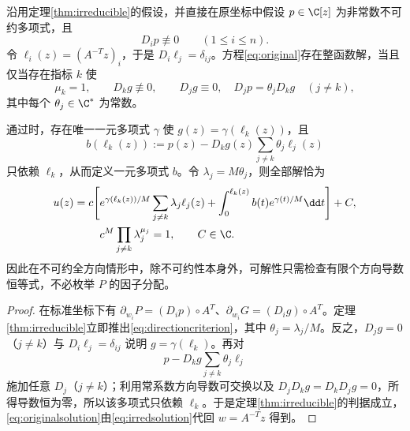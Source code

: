 
\begin{corollary}[原坐标中的无枚举判据]\label{cor:originalcriterion}
沿用定理\ref{thm:irreducible}的假设，并直接在原坐标中假设 $p\in\C[z]$ 为非常数不可约多项式，且
\[
D_i p\not\equiv0\qquad(1\le i\le n).
\]
令 $\ell_i(z)=(A^{-T}z)_i$，于是 $D_i\ell_j=\delta_{ij}$。方程\eqref{eq:original}存在整函数解，当且仅当存在指标 $k$ 使
\begin{equation}\label{eq:directioncriterion}
\mu_k=1,\qquad D_k g\not\equiv0,\qquad
D_jg\equiv0,\quad D_jp=\theta_jD_kg\quad(j\ne k),
\end{equation}
其中每个 $\theta_j\in\C^*$ 为常数。

通过时，存在唯一一元多项式 $\gamma$ 使 $g(z)=\gamma(\ell_k(z))$，且
\[
b(\ell_k(z)):=p(z)-D_kg(z)\sum_{j\ne k}\theta_j\ell_j(z)
\]
只依赖 $\ell_k$，从而定义一元多项式 $b$。令 $\lambda_j=M\theta_j$，则全部解恰为
\begin{equation}\label{eq:originalsolution}
\begin{split}
u(z)=c\Bigg[&e^{\gamma(\ell_k(z))/M}\sum_{j\ne k}\lambda_j\ell_j(z)
+\int_0^{\ell_k(z)}b(t)e^{\gamma(t)/M}\dd t\Bigg]+C,\\
&c^M\prod_{j\ne k}\lambda_j^{\mu_j}=1,
\qquad C\in\C.
\end{split}
\end{equation}
因此在不可约全方向情形中，除不可约性本身外，可解性只需检查有限个方向导数恒等式，不必枚举 $P$ 的因子分配。
\end{corollary}
\begin{proof}
在标准坐标下有 $\partial_{w_i}P=(D_ip)\circ A^T$、$\partial_{w_i}G=(D_ig)\circ A^T$。定理\ref{thm:irreducible}立即推出\eqref{eq:directioncriterion}，其中 $\theta_j=\lambda_j/M$。反之，$D_jg=0$（$j\ne k$）与 $D_i\ell_j=\delta_{ij}$ 说明 $g=\gamma(\ell_k)$。再对
\[
p-D_kg\sum_{j\ne k}\theta_j\ell_j
\]
施加任意 $D_j$（$j\ne k$）；利用常系数方向导数可交换以及 $D_jD_kg=D_kD_jg=0$，所得导数恒为零，所以该多项式只依赖 $\ell_k$。于是定理\ref{thm:irreducible}的判据成立，\eqref{eq:originalsolution}由\eqref{eq:irredsolution}代回 $w=A^{-T}z$ 得到。
\end{proof}

